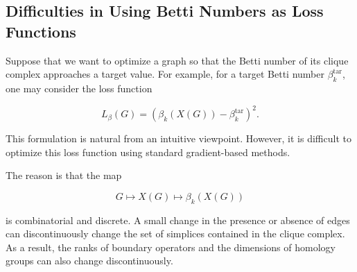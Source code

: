 \documentclass[pdflatex,sn-mathphys-ay]{sn-jnl}%
\theoremstyle{thmstyleone}%
\theoremstyle{thmstyletwo}%
\theoremstyle{thmstylethree}%
\begin{document}
\subsection{Difficulties in Using Betti Numbers as Loss Functions}

Suppose that we want to optimize a graph so that the Betti number of its clique complex approaches a target value.
For example, for a target Betti number \(\beta_k^{\mathrm{tar}}\), one may consider the loss function

\[
L_{\beta}(G)
=
\left(
\beta_k(X(G))-\beta_k^{\mathrm{tar}}
\right)^2.
\]

This formulation is natural from an intuitive viewpoint.
However, it is difficult to optimize this loss function using standard gradient-based methods.

The reason is that the map

\[
G \longmapsto X(G) \longmapsto \beta_k(X(G))
\]

is combinatorial and discrete.
A small change in the presence or absence of edges can discontinuously change the set of simplices contained in the clique complex.
As a result, the ranks of boundary operators and the dimensions of homology groups can also change discontinuously.









\end{document}
